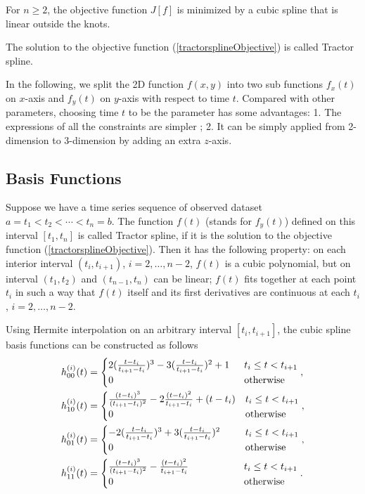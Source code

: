 \begin{theorem}
For $n\geq2$, the objective function $J[f]$ is minimized by a cubic spline that is linear outside the knots.
\end{theorem}
The solution to the objective function (\ref{tractorsplineObjective}) is called Tractor spline.

In the following, we split the 2D function $f(x,y)$ into two sub functions $f_x(t)$ on $x$-axis and $f_y(t)$ on $y$-axis with respect to time $t$. Compared with other parameters, choosing time $t$ to be the parameter has some advantages: 1. The expressions of all the constraints are simpler \cite{zhang2013cubic}; 2. It can be simply applied from 2-dimension to 3-dimension by adding an extra $z$-axis.  

\subsection{Basis Functions}
Suppose we have a time series sequence of observed dataset $a=t_1<t_2<\cdots<t_n=b$. The function $f(t)$ (stands for $f_y(t)$) defined on this interval $[t_1,t_n]$ is called Tractor spline, if it is the solution to the objective function (\ref{tractorsplineObjective}). Then it has the following property: on each interior interval $(t_i,t_{i+1})$, $i=2,\ldots,n-2$, $f(t)$ is a cubic polynomial, but on interval $(t_1,t_2)$ and $(t_{n-1},t_n)$ can be linear; $f(t)$ fits together at each point $t_i$ in such a way that $f(t)$ itself and its first derivatives are continuous at each $t_i$,  $i=2,\ldots,n-2$. 

Using Hermite interpolation on an arbitrary interval $[t_i,t_{i+1}]$, the cubic spline basis functions can be constructed as follows
\begin{align}\label{hermitebasis1}
& h_{00}^{(i)}(t)=
\begin{cases}
2(\frac{t-t_{i}}{t_{i+1}-t_{i}})^3-3(\frac{t-t_{i}}{t_{i+1}-t_{i}})^2+1 \hphantom{1} & t_i\leq t<t_{i+1} \\ 
0 & \mbox{otherwise}
\end{cases}, \\
& h_{10}^{(i)}(t)=\begin{cases}
\frac{(t-t_{i})^3}{(t_{i+1}-t_{i})^2}-2\frac{(t-t_{i})^2}{t_{i+1}-t_{i}}+(t-t_{i})   & t_i\leq t<t_{i+1} \\ 
0 &   \mbox{otherwise}
\end{cases},\\
& h_{01}^{(i)}(t)=
\begin{cases}
-2(\frac{t-t_i}{t_{i+1}-t_i})^3+3(\frac{t-t_i}{t_{i+1}-t_i})^2 \hphantom{+1.} & t_i\leq t<t_{i+1} \\ 
0 &   \mbox{otherwise}
\end{cases},\\
& h_{11}^{(i)}(t)=\begin{cases}
\frac{(t-t_i)^3}{(t_{i+1}-t_i)^2}-\frac{(t-t_i)^2}{t_{i+1}-t_i}  \hphantom{+t-123-}  & t_i\leq t<t_{i+1} \\ 
0 &   \mbox{otherwise}
\end{cases}.
\end{align}

